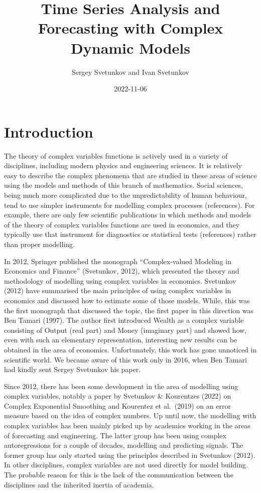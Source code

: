 \documentclass[
]{book}
\title{Time Series Analysis and Forecasting with Complex Dynamic Models}
\author{Sergey Svetunkov and Ivan Svetunkov}
\date{2022-11-06}
\begin{document}
\maketitle

{
\setcounter{tocdepth}{1}
\tableofcontents
}
\hypertarget{introduction}{%
\chapter*{Introduction}\label{introduction}}

The theory of complex variables functions is actively used in a variety of disciplines, including modern physics and engineering sciences. It is relatively easy to describe the complex phenomena that are studied in these areas of science using the models and methods of this branch of mathematics. Social sciences, being much more complicated due to the unpredictability of human behaviour, tend to use simpler instruments for modelling complex processes (references). For example, there are only few scientific publications in which methods and models of the theory of complex variables functions are used in economics, and they typically use that instrument for diagnostics or statistical tests (references) rather than proper modelling.

In 2012, Springer published the monograph ``Complex-valued Modeling in Economics and Finance'' (Svetunkov, 2012), which presented the theory and methodology of modelling using complex variables in economics. Svetunkov (2012) have summarised the main principles of using complex variables in economics and discussed how to estimate some of those models. While, this was the first monograph that discussed the topic, the first paper in this direction was Ben Tamari (1997). The author first introduced Wealth as a complex variable consisting of Output (real part) and Money (imaginary part) and showed how, even with such an elementary representation, interesting new results can be obtained in the area of economics. Unfortunately, this work has gone unnoticed in scientific world. We became aware of this work only in 2016, when Ben Tamari had kindly sent Sergey Svetunkov his paper.

Since 2012, there has been some development in the area of modelling using complex variables, notably a paper by Svetunkov \& Kourentzes (2022) on Complex Exponential Smoothing and Kourentez et al.~(2019) on an error measure based on the idea of complex numbers. Up until now, the modelling with complex variables has been mainly picked up by academics working in the areas of forecasting and engineering. The latter group has been using complex autoregressions for a couple of decades, modelling and predicting signals. The former group has only started using the principles described in Svetunkov (2012). In other disciplines, complex variables are not used directly for model building. The probable reason for this is the lack of the communication between the disciplines and the inherited inertia of academia.
\end{document}

